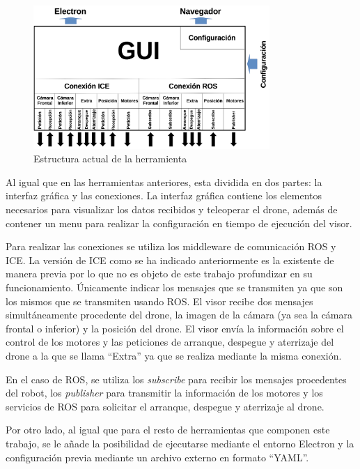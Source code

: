 \begin{figure}[H]
  \begin{center}
    \includegraphics[width=0.8\textwidth]{figures/estrucuturadroneviz2.png}
		\caption{Estructura actual de la herramienta}
		\label{fig.estructuracamviz2}
		\end{center}
\end{figure}

Al igual que en las herramientas anteriores, esta dividida en dos partes: la interfaz gráfica y las conexiones. La interfaz gráfica contiene los elementos necesarios para visualizar los datos recibidos y teleoperar el drone, además de contener un menu para realizar la configuración en tiempo de ejecución del visor.

Para realizar las conexiones se utiliza los middleware de comunicación ROS y ICE. La versión de ICE como se ha indicado anteriormente es la existente de manera previa por lo que no es objeto de este trabajo profundizar en su funcionamiento. Únicamente indicar los mensajes que se transmiten ya que son los mismos que se transmiten usando ROS. El visor recibe dos mensajes simultáneamente procedente del drone, la imagen de la cámara (ya sea la cámara frontal o inferior) y la posición del drone. El visor envía la información sobre el control de los motores y las peticiones de arranque, despegue y aterrizaje del drone a la que se llama ``Extra'' ya que se realiza mediante la misma conexión.

En el caso de ROS, se utiliza los \textit{subscribe} para recibir los mensajes procedentes del robot, los \textit{publisher} para transmitir la información de los motores y los servicios de ROS para solicitar el arranque, despegue y aterrizaje al drone.

Por otro lado, al igual que para el resto de herramientas que componen este trabajo, se le añade la posibilidad de ejecutarse mediante el entorno Electron y la configuración previa mediante un archivo externo en formato ``YAML''.

